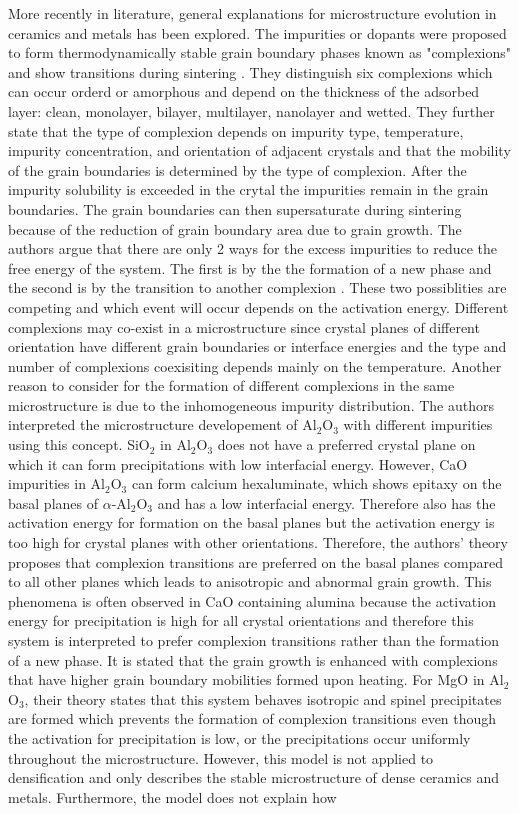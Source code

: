 More recently in literature, general explanations for microstructure evolution in ceramics and metals has been explored. The impurities or dopants were proposed to form thermodynamically stable grain boundary phases known as "complexions" and show transitions during sintering \cite{Bateman1989,Soni1995,Bennison1983,Roy1968}. They distinguish six complexions which can occur orderd or amorphous and depend on the thickness of the adsorbed layer: clean, monolayer, bilayer, multilayer, nanolayer and wetted.  They further state that the type of complexion depends on impurity type, temperature, impurity concentration, and orientation of adjacent crystals and that the mobility of the grain boundaries is determined by the type of complexion. After the impurity solubility is exceeded in the crytal the impurities remain in the grain boundaries. The grain boundaries can then supersaturate during sintering because of the reduction of grain boundary area due to grain growth. The authors argue that there are only 2 ways for the excess impurities to reduce the free energy of the system. The first is by the the formation of a new phase and the second is by the transition to another complexion \cite{Dillon2010}. These two possiblities are competing and which event will occur depends on the activation energy. Different complexions may co-exist in a microstructure since crystal planes of different orientation have different grain boundaries or interface energies and the type and number of complexions coexisiting depends mainly on the temperature. Another reason to consider for the formation of different complexions in the same microstructure is due to the inhomogeneous impurity distribution. The authors interpreted the microstructure developement of Al$_{2}$O$_{3}$ with different impurities using this concept. SiO$_{2}$ in Al$_{2}$O$_{3}$ does not have a preferred crystal plane on which it can form precipitations with low interfacial energy. However, CaO impurities in Al$_{2}$O$_{3}$ can form calcium hexaluminate, which shows epitaxy on the basal planes of $\alpha$-Al$_{2}$O$_{3}$ and has a low interfacial energy. Therefore also has the activation energy for formation on the basal planes but the activation energy is too high for crystal planes with other orientations. Therefore, the authors' theory proposes that complexion transitions are preferred on the basal planes compared to all other planes which leads to anisotropic and abnormal grain growth. This phenomena is often observed in CaO containing alumina because the activation energy for precipitation is high for all crystal orientations and therefore this system is interpreted to prefer complexion transitions rather than the formation of a new phase. It is stated that the grain growth is enhanced with complexions that have higher grain boundary mobilities formed upon heating. For MgO in Al$_{2}$O$_{3}$, their theory states that this system behaves isotropic and spinel precipitates are formed which prevents the formation of complexion transitions even though the activation for precipitation is low, or the precipitations occur uniformly throughout the microstructure. However, this model is not applied to densification and only describes the stable microstructure of dense ceramics and metals. Furthermore, the model does not explain how 